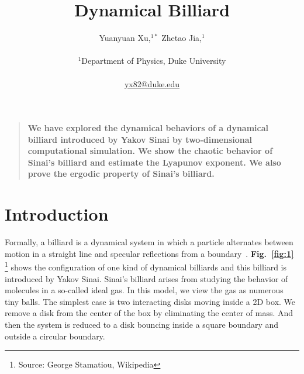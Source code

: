 \documentclass[12pt]{article}
\title{Dynamical Billiard}
\author
{Yuanyuan Xu,$^{1\ast}$ Zhetao Jia,$^{1}$\\
\\
\normalsize{$^{1}$Department of Physics, Duke University}\\
\\
\normalsize{\url{yx82@duke.edu}}
}
\date{}
\newenvironment{sciabstract}{%
\begin{quote} \bf}
{\end{quote}}
\begin{document}
 


\baselineskip24pt


\maketitle 




\begin{sciabstract}
  We have explored the dynamical behaviors of a dynamical billiard introduced by Yakov Sinai by two-dimensional computational simulation. We show the chaotic behavior of Sinai's billiard and estimate the Lyapunov exponent. We also prove the ergodic property of Sinai's billiard. 
\end{sciabstract}




\section*{Introduction}
Formally, a billiard is a dynamical system in which a particle alternates between motion in a straight line and specular reflections from a boundary~\cite{wiki:db}. {\bf Fig.~\ref{fig:1}} \footnote{Source: George Stamatiou, Wikipedia} shows the configuration of one kind of dynamical billiards and this billiard is introduced by Yakov Sinai. Sinai's billiard arises from studying the behavior of molecules in a so-called ideal gas. In this model, we view the gas as numerous tiny balls. The simplest case is two interacting disks moving inside a 2D box. We remove a disk from the center of the box by eliminating the center of mass. And then the system is reduced to a disk bouncing inside a square boundary and outside a circular boundary.
\end{document}
